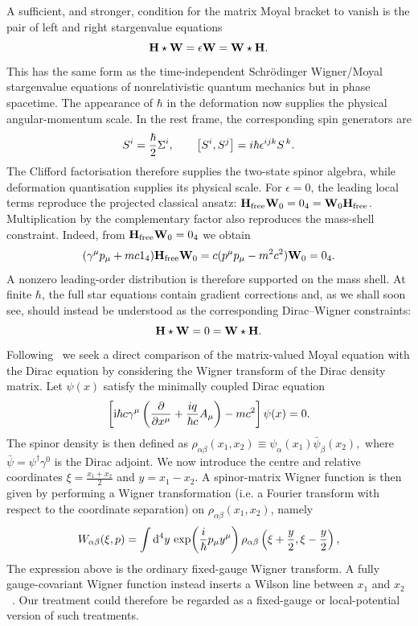 \documentclass[final,5p,times,twocolumn]{elsarticle}
\begin{document}
A sufficient, and stronger, condition for the matrix Moyal bracket
to vanish is the pair of left and right stargenvalue equations
\begin{equation}
  \mathbf{H}\star\mathbf{W}
  =\epsilon\mathbf{W}
  =\mathbf{W}\star\mathbf{H}.
  \label{eq:left-right-stargenvalue}
\end{equation}
This has the same form as the time-independent Schr\"odinger Wigner/Moyal stargenvalue equations of nonrelativistic quantum mechanics but in phase spacetime. The appearance of $\hbar$ in the deformation now supplies the
physical angular-momentum scale. In the rest frame, the corresponding spin generators
are
\begin{equation}
  S^i
  =\frac{\hbar}{2}\Sigma^i,
  \qquad
  \left[{S^i} ,{S^j}\right]
  =i\hbar\epsilon^{ijk}S^{\,k}.
  \label{eq:physical-spin}
\end{equation}
The Clifford factorisation therefore supplies the two-state spinor algebra, while deformation quantisation supplies its physical scale.
For $\epsilon=0$, the leading local terms reproduce the projected classical ansatz: $\mathbf{H}_{\mathrm{free}}\mathbf{W}_0=0_4=\mathbf{W}_0\mathbf{H}_{\mathrm{free}}$. Multiplication by the complementary factor also reproduces the mass-shell constraint. Indeed, from $\mathbf{H}_{\mathrm{free}}\mathbf{W}_0=0_4$ we obtain
\begin{equation}
  (\gamma^\mu p_\mu+mc 1_4)
  \mathbf{H}_{\mathrm{free}}\mathbf{W}_0
  =
  c(p^\mu p_\mu-m^2c^2)\mathbf{W}_0=0_4.
  \label{eq:mass-shell-from-star}
\end{equation}
A nonzero leading-order distribution is therefore supported on the mass shell. 
At finite $\hbar$, the full star equations contain gradient corrections and, as we shall soon see, should instead be understood as the
corresponding Dirac--Wigner constraints:
\begin{equation}
\mathbf{H} \star \mathbf{W} = 0
= \mathbf{W} \star \mathbf{H}. \label{eq:left-right-stargenvalue-epsilon-zero}
\end{equation}
Following~\cite{D1,D2,D3,D4} we seek a direct comparison of the matrix-valued Moyal equation with the Dirac equation by considering the Wigner transform of the Dirac density matrix.  Let $\psi(x)$ satisfy
the minimally coupled Dirac equation
$$
    \left[
        \ui\hbar c\gamma^\mu
        \left(
            \PD{}{x^\mu}
            +
            \frac{iq}{\hbar c}A_\mu
        \right)
        - mc^2
    \right]
    \psi(x)
    =
    0.
$$
The spinor density is then defined as
$
    \rho_{\alpha\beta}(x_1,x_2)
    \equiv
    \psi_\alpha(x_1)\bar\psi_\beta(x_2),
$
where $\bar \psi = \psi^\dag \gamma^0$ is the Dirac adjoint.
We now introduce the centre and relative coordinates
$
\xi=\frac{x_1+x_2}{2}$ and $
y=x_1-x_2.
$
A spinor-matrix Wigner function is then given by performing a Wigner transformation (i.e. a Fourier transform with respect to the coordinate separation) on $\rho_{\alpha\beta}(x_1,x_2)$, namely
$$
W_{\alpha\beta}(\xi,p)
=
\int \mathrm{d}^4y\,
\exp\!\left(\frac{i}{\hbar}p_\mu y^\mu\right)
\rho_{\alpha\beta}\left(\xi+\frac{y}{2},\xi-\frac{y}{2}\right),
$$
The expression above is the ordinary fixed-gauge Wigner transform.
A fully gauge-covariant Wigner function instead inserts a Wilson line between $x_1$ and $x_2$~\cite{D1,wilsonLine}. Our treatment could therefore be regarded as a fixed-gauge or local-potential version of such treatments.
\end{document}
